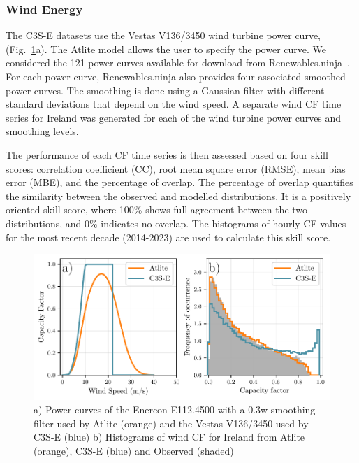 \documentclass[preprint, 12pt]{elsarticle}
\begin{document}
\subsubsection{Wind Energy}
\label{sec:wind_verification}

The C3S-E datasets use the Vestas V136/3450 wind turbine power curve, (Fig.~\ref{fig:power_curve}a). The Atlite model allows the user to specify the power curve. We considered the 121 power curves available for download from Renewables.ninja~\citep{staffell2016wake}. For each power curve, Renewables.ninja also provides four associated smoothed power curves. The smoothing is done using a Gaussian filter with different standard deviations that depend on the wind speed. A separate wind CF time series for Ireland was generated for each of the wind turbine power curves and smoothing levels.

The performance of each CF time series is then assessed based on four skill scores: correlation coefficient (CC), root mean square error (RMSE), mean bias error (MBE), and the percentage of overlap. The percentage of overlap quantifies the similarity between the observed and modelled distributions. It is a positively oriented skill score, where 100\% shows full agreement between the two distributions, and 0\% indicates no overlap. The histograms of hourly CF values for the most recent decade (2014-2023) are used to calculate this skill score.

\begin{figure}[!ht]
	\centering
	\includegraphics[width=\textwidth]{verification_power_curve.pdf}
	\caption{a) Power curves of the Enercon E112.4500 with a 0.3w smoothing filter used by Atlite (orange) and the Vestas V136/3450 used by C3S-E (blue) b) Histograms of wind CF for Ireland from Atlite (orange), C3S-E (blue) and Observed (shaded)}
	\label{fig:power_curve}
\end{figure}
\end{document}
